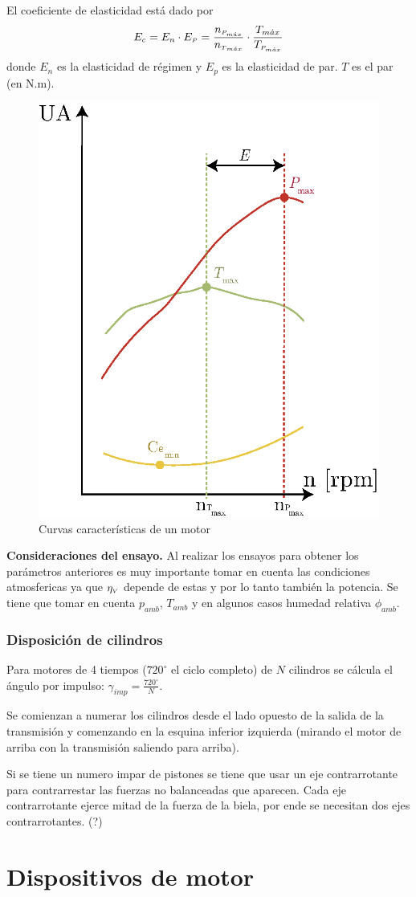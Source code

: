 El coeficiente de elasticidad está dado por
\[
E_c=E_n\cdot E_{ \mbox{\tiny$P$}} = \frac{n_{{ \mbox{\tiny$P_{m\acute{a}x}$}}}}{n_{{ \mbox{\tiny$T$}}_{m\acute{a}x}}} \cdot \frac{T_{{m\acute{a}x}}}{T_{{ \mbox{\tiny$P_{m\acute{a}x}$}}}}
\]
donde $E_n$ es la elasticidad de régimen y $E_p$ es la elasticidad de par. $T$ es el par (en N.m).

\begin{figure}
    \centering
    \includegraphics[width=.47\textwidth]{fig/curvaCaract.eps}
    \caption{Curvas características de un motor}
    \label{fig:curvacaract}
\end{figure}
\textbf{Consideraciones del ensayo.} Al realizar los ensayos para obtener los parámetros anteriores es muy importante tomar en cuenta las condiciones atmosfericas ya que $\eta_{{\mbox{\tiny$V$}}}$ depende de estas y por lo tanto también la potencia. Se tiene que tomar en cuenta $p_{amb}$, $T_{amb}$ y en algunos casos humedad relativa $\phi_{amb}$.
\section{Disposición de cilindros}
Para motores de 4 tiempos ($720^\circ$ el ciclo completo) de $N$ cilindros se cálcula el ángulo por impulso: $\gamma_{imp} = \frac{720^\circ}{N}$.

Se comienzan a numerar los cilindros desde el lado opuesto de la salida de la transmisión y comenzando en la esquina inferior izquierda (mirando el motor de arriba con la transmisión saliendo para arriba).

Si se tiene un numero impar de pistones se tiene que usar un eje contrarrotante para contrarrestar las fuerzas no balanceadas que aparecen. Cada eje contrarrotante ejerce mitad de la fuerza de la biela, por ende se necesitan dos ejes contrarrotantes. (?)




\part{Dispositivos de motor}

